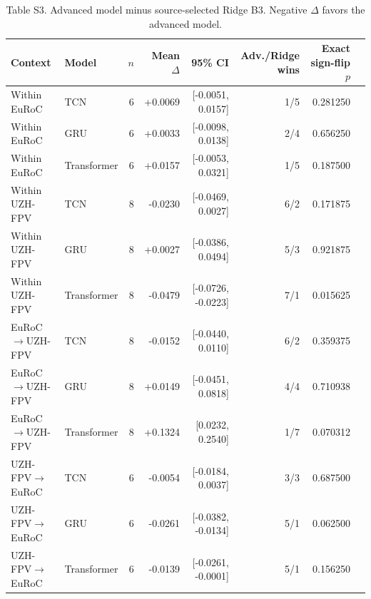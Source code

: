 \documentclass[11pt]{article}
\begin{document}
\begin{table}[htbp]\centering
\caption*{Table S3. Advanced model minus source-selected Ridge B3. Negative $\Delta$ favors the advanced model.}
\scriptsize
\begin{tabular}{llrrrrrr}
\toprule
Context & Model & $n$ & Mean $\Delta$ & 95\% CI & Adv./Ridge wins & Exact sign-flip $p$\\
\midrule
Within EuRoC & TCN & 6 & +0.0069 & [-0.0051, 0.0157] & 1/5 & 0.281250 \\
Within EuRoC & GRU & 6 & +0.0033 & [-0.0098, 0.0138] & 2/4 & 0.656250 \\
Within EuRoC & Transformer & 6 & +0.0157 & [-0.0053, 0.0321] & 1/5 & 0.187500 \\
Within UZH-FPV & TCN & 8 & -0.0230 & [-0.0469, 0.0027] & 6/2 & 0.171875 \\
Within UZH-FPV & GRU & 8 & +0.0027 & [-0.0386, 0.0494] & 5/3 & 0.921875 \\
Within UZH-FPV & Transformer & 8 & -0.0479 & [-0.0726, -0.0223] & 7/1 & 0.015625 \\
EuRoC$\rightarrow$UZH-FPV & TCN & 8 & -0.0152 & [-0.0440, 0.0110] & 6/2 & 0.359375 \\
EuRoC$\rightarrow$UZH-FPV & GRU & 8 & +0.0149 & [-0.0451, 0.0818] & 4/4 & 0.710938 \\
EuRoC$\rightarrow$UZH-FPV & Transformer & 8 & +0.1324 & [0.0232, 0.2540] & 1/7 & 0.070312 \\
UZH-FPV$\rightarrow$EuRoC & TCN & 6 & -0.0054 & [-0.0184, 0.0037] & 3/3 & 0.687500 \\
UZH-FPV$\rightarrow$EuRoC & GRU & 6 & -0.0261 & [-0.0382, -0.0134] & 5/1 & 0.062500 \\
UZH-FPV$\rightarrow$EuRoC & Transformer & 6 & -0.0139 & [-0.0261, -0.0001] & 5/1 & 0.156250 \\
\bottomrule
\end{tabular}
\end{table}
\end{document}
